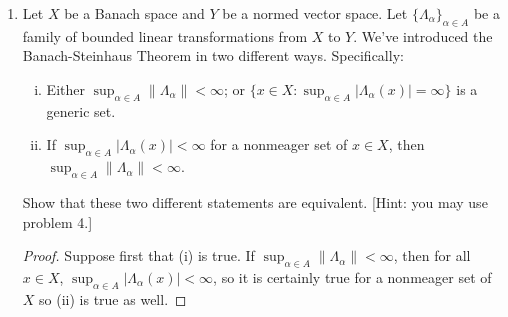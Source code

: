 \documentclass[11pt,oneside,english]{amsart}
\theoremstyle{definition}
\newcommand{\MB}[1]{\mathbb{#1}}
\begin{document}
\begin{enumerate}
\begin{enumerate}
\begin{proof}
Let $E\subset X$. $E$ is of first category if and only if it is a countable union of nowhere dense sets, i.e.
\begin{align*}
E&=\bigcup_{n=1}^\infty A_n\\[2mm]
E^c&=\left(\bigcup_{n=1}^\infty A_n\right)^c\\[2mm]
E^c&=\bigcap_{n=1}^\infty A_n^c,
\end{align*}
where $A_n$ is nowhere dense for each $n\in\MB{Z}^+$. Since $A_n$ is nowhere dense, $(A_n^c)^{\circ}$ is dense by part (a), and since $(A_n^c)^{\circ}\subset A_n^c$ for all $n$, $\bigcap_{n=1}^\infty(A_n^c)^\circ\subset\bigcap_{n=1}^\infty A_n^c=E^c$. But $\bigcap_{n=1}^\infty(A_n^c)^\circ$ is a countable intersection of dense sets, i.e. a generic set. Therefore, $E^c$ contains a generic set.
\end{proof}

\item Can you find a meager set in some complete metric space that is dense as well? [You may use problem 3.]

Yes, for example the rational numbers as a subset of the real numbers can be written as a countable union of singleton sets, which are nowhere dense. However, the rational numbers are also dense, so there exist dense meager sets.
\end{enumerate} 


\item Let $X$ be a Banach space and $Y$ be a normed vector space. Let $\{\Lambda_\alpha\}_{\alpha\in A}$ be a family of bounded linear transformations from $X$ to $Y$. We've introduced the Banach-Steinhaus Theorem in two different ways. Specifically:

\begin{enumerate}[(i)]
\item Either $\sup_{\alpha\in A}\|\Lambda_\alpha\|<\infty$; or $\{x\in X: \sup_{\alpha\in A}|\Lambda_\alpha(x)|=\infty\}$ is a generic set.

\item If $\sup_{\alpha\in A}|\Lambda_\alpha(x)|<\infty$ for a nonmeager set of $x\in X$, then $\sup_{\alpha\in A}\|\Lambda_\alpha\|<\infty$.
\end{enumerate}

Show that these two different statements are equivalent. [Hint: you may use problem 4.]

\begin{proof}
Suppose first that (i) is true. If $\sup_{\alpha\in A}\|\Lambda_\alpha\|<\infty$, then for all $x\in X$, $\sup_{\alpha\in A}|\Lambda_\alpha(x)|<\infty$, so it is certainly true for a nonmeager set of $X$ so (ii) is true as well.


\end{proof}
\end{enumerate}
\end{document}
